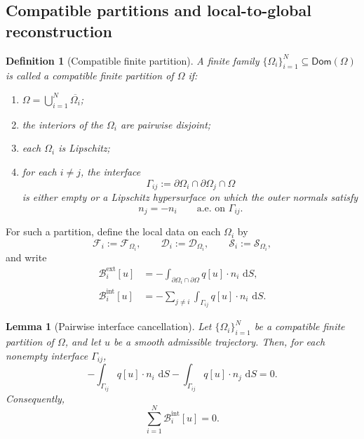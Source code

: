 \documentclass[10pt,a4paper]{amsart}
\newtheorem{definition}[theorem]{Definition}
\newtheorem{lemma}[theorem]{Lemma}
\newcommand{\Om}{\Omega}
\newcommand{\pa}{\partial}
\newcommand{\cl}{\overline}
\newcommand{\dd}{\,\mathrm{d}}
\newcommand{\F}{\mathcal{F}}
\newcommand{\Diss}{\mathcal{D}}
\newcommand{\Bnd}{\mathcal{B}}
\newcommand{\Src}{\mathcal{S}}
\begin{document}
\subsection{Compatible partitions and local-to-global reconstruction}

\begin{definition}[Compatible finite partition]\label{def:compatible-partition}
A finite family \(\{\Om_i\}_{i=1}^N\subseteq \mathsf{Dom}(\Om)\) is called a
\emph{compatible finite partition} of \(\Om\) if:
\begin{enumerate}[label=(\roman*),leftmargin=1.1cm]
    \item \(\Om=\bigcup_{i=1}^N \cl{\Om_i}\);
    \item the interiors of the \(\Om_i\) are pairwise disjoint;
    \item each \(\Om_i\) is Lipschitz;
    \item for each \(i\neq j\), the interface
    \[
    \Gamma_{ij}:=\pa\Om_i\cap \pa\Om_j\cap \Om
    \]
    is either empty or a Lipschitz hypersurface on which the outer normals satisfy
    \[
    n_j=-n_i
    \qquad \text{a.e. on }\Gamma_{ij}.
    \]
\end{enumerate}
\end{definition}

For such a partition, define the local data on each \(\Om_i\) by
\[
\F_i:=\F_{\Om_i},\qquad
\Diss_i:=\Diss_{\Om_i},\qquad
\Src_i:=\Src_{\Om_i},
\]
and write
\begin{align}
\Bnd_i^{\mathrm{ext}}[u]
&=
-\int_{\pa\Om_i\cap \pa\Om} q[u]\cdot n_i\,\dd S,\label{eq:Biext}\\
\Bnd_i^{\mathrm{int}}[u]
&=
-\sum_{j\neq i}\int_{\Gamma_{ij}} q[u]\cdot n_i\,\dd S.\label{eq:Biint}
\end{align}

\begin{lemma}[Pairwise interface cancellation]\label{lem:pairwise-cancel}
Let \(\{\Om_i\}_{i=1}^N\) be a compatible finite partition of \(\Om\), and let \(u\)
be a smooth admissible trajectory. Then, for each nonempty interface \(\Gamma_{ij}\),
\begin{equation}\label{eq:pairwise-cancel}
-\int_{\Gamma_{ij}} q[u]\cdot n_i\,\dd S
-
\int_{\Gamma_{ij}} q[u]\cdot n_j\,\dd S
=
0.
\end{equation}
Consequently,
\begin{equation}\label{eq:sum-Bint-zero}
\sum_{i=1}^N \Bnd_i^{\mathrm{int}}[u]=0.
\end{equation}
\end{lemma}
\end{document}
